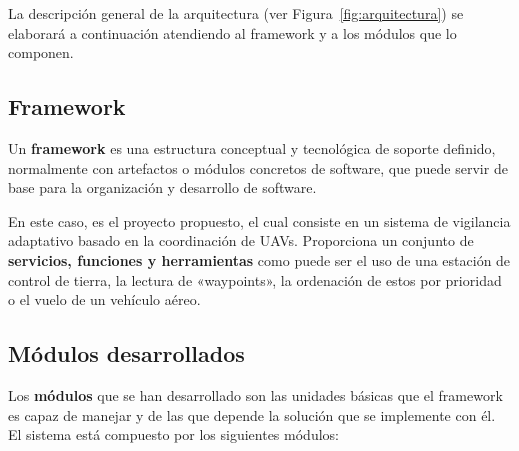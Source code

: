La descripción general de la arquitectura (ver Figura~\ref{fig:arquitectura}) se elaborará a continuación atendiendo al framework y a los módulos que lo componen.

\subsection{Framework}
\label{sec:framework}

Un \textbf{framework} es una estructura conceptual y tecnológica de soporte definido, normalmente con artefactos o módulos concretos de software, que puede servir de base para la organización y desarrollo de software.

En este caso, es el proyecto propuesto, el cual consiste en un sistema de vigilancia adaptativo basado en la coordinación de \acs{UAV}s. Proporciona un conjunto de \textbf{servicios, funciones y herramientas} como puede ser el uso de una estación de control de tierra, la lectura de «waypoints», la ordenación de estos por prioridad o el vuelo de un vehículo aéreo.

\subsection{Módulos desarrollados}
\label{sec:modulos}

Los \textbf{módulos} que se han desarrollado son las unidades básicas que el framework es capaz de manejar y de las que depende la solución que se implemente con él. El sistema está compuesto por los siguientes módulos:

